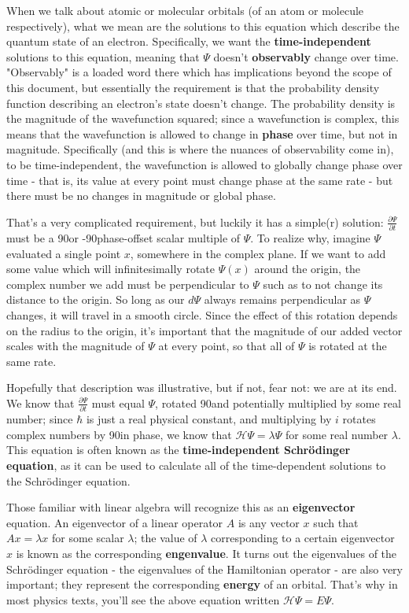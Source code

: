 \documentclass{article}
\newcommand{\ham}{\mathcal{H}}
\begin{document}
When we talk about atomic or molecular orbitals (of an atom or molecule respectively), what we mean are the solutions to this equation which describe the quantum state of an electron. Specifically, we want the \textbf{time-independent} solutions to this equation, meaning that $\Psi$ doesn't \textbf{observably} change over time. "Observably" is a loaded word there which has implications beyond the scope of this document, but essentially the requirement is that the probability density function describing an electron's state doesn't change. The probability density is the magnitude of the wavefunction squared; since a wavefunction is complex, this means that the wavefunction is allowed to change in \textbf{phase} over time, but not in magnitude. Specifically (and this is where the nuances of observability come in), to be time-independent, the wavefunction is allowed to globally change phase over time - that is, its value at every point must change phase at the same rate - but there must be no changes in magnitude or global phase.

That's a very complicated requirement, but luckily it has a simple(r) solution: $\frac{\partial{\Psi}}{\partial{t}}$ must be a 90\textdegree or -90\textdegree phase-offset scalar multiple of $\Psi$. To realize why, imagine $\Psi$ evaluated a single point $x$, somewhere in the complex plane. If we want to add some value which will infinitesimally rotate $\Psi(x)$ around the origin, the complex number we add must be perpendicular to $\Psi$ such as to not change its distance to the origin. So long as our $d\Psi$ always remains perpendicular as $\Psi$ changes, it will travel in a smooth circle. Since the effect of this rotation depends on the radius to the origin, it's important that the magnitude of our added vector scales with the magnitude of $\Psi$ at every point, so that all of $\Psi$ is rotated at the same rate.

Hopefully that description was illustrative, but if not, fear not: we are at its end. We know that $\frac{\partial{\Psi}}{\partial{t}}$ must equal $\Psi$, rotated 90\textdegree and potentially multiplied by some real number; since $\hbar$ is just a real physical constant, and multiplying by $i$ rotates complex numbers by 90\textdegree in phase, we know that $\ham\Psi =\lambda \Psi$ for some real number $\lambda$. This equation is often known as the \textbf{time-independent Schr\"odinger equation}, as it can be used to calculate all of the time-dependent solutions to the Schr\"odinger equation. 

Those familiar with linear algebra will recognize this as an \textbf{eigenvector} equation. An eigenvector of a linear operator $A$ is any vector $x$ such that $Ax = \lambda x$ for some scalar $\lambda$; the value of $\lambda$ corresponding to a certain eigenvector $x$ is known as the corresponding \textbf{engenvalue}. It turns out the eigenvalues of the Schr\"odinger equation - the eigenvalues of the Hamiltonian operator - are also very important; they represent the corresponding \textbf{energy} of an orbital. That's why in most physics texts, you'll see the above equation written $\ham\Psi = E\Psi$.
\end{document}
